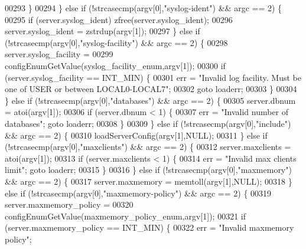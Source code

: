 \begin{DoxyCode}
{{00293             \}
00294         \} \textcolor{keywordflow}{else} \textcolor{keywordflow}{if} (!strcasecmp(argv[0],\textcolor{stringliteral}{"syslog-ident"}) && argc == 2) \{
00295             \textcolor{keywordflow}{if} (server.syslog\_ident) zfree(server.syslog\_ident);
00296             server.syslog\_ident = zstrdup(argv[1]);
00297         \} \textcolor{keywordflow}{else} \textcolor{keywordflow}{if} (!strcasecmp(argv[0],\textcolor{stringliteral}{"syslog-facility"}) && argc == 2) \{
00298             server.syslog\_facility =
00299                 configEnumGetValue(syslog\_facility\_enum,argv[1]);
00300             \textcolor{keywordflow}{if} (server.syslog\_facility == INT\_MIN) \{
00301                 err = \textcolor{stringliteral}{"Invalid log facility. Must be one of USER or between LOCAL0-LOCAL7"};
00302                 \textcolor{keywordflow}{goto} loaderr;
00303             \}
00304         \} \textcolor{keywordflow}{else} \textcolor{keywordflow}{if} (!strcasecmp(argv[0],\textcolor{stringliteral}{"databases"}) && argc == 2) \{
00305             server.dbnum = atoi(argv[1]);
00306             \textcolor{keywordflow}{if} (server.dbnum < 1) \{
00307                 err = \textcolor{stringliteral}{"Invalid number of databases"}; \textcolor{keywordflow}{goto} loaderr;
00308             \}
00309         \} \textcolor{keywordflow}{else} \textcolor{keywordflow}{if} (!strcasecmp(argv[0],\textcolor{stringliteral}{"include"}) && argc == 2) \{
00310             loadServerConfig(argv[1],NULL);
00311         \} \textcolor{keywordflow}{else} \textcolor{keywordflow}{if} (!strcasecmp(argv[0],\textcolor{stringliteral}{"maxclients"}) && argc == 2) \{
00312             server.maxclients = atoi(argv[1]);
00313             \textcolor{keywordflow}{if} (server.maxclients < 1) \{
00314                 err = \textcolor{stringliteral}{"Invalid max clients limit"}; \textcolor{keywordflow}{goto} loaderr;
00315             \}
00316         \} \textcolor{keywordflow}{else} \textcolor{keywordflow}{if} (!strcasecmp(argv[0],\textcolor{stringliteral}{"maxmemory"}) && argc == 2) \{
00317             server.maxmemory = memtoll(argv[1],NULL);
00318         \} \textcolor{keywordflow}{else} \textcolor{keywordflow}{if} (!strcasecmp(argv[0],\textcolor{stringliteral}{"maxmemory-policy"}) && argc == 2) \{
00319             server.maxmemory\_policy =
00320                 configEnumGetValue(maxmemory\_policy\_enum,argv[1]);
00321             \textcolor{keywordflow}{if} (server.maxmemory\_policy == INT\_MIN) \{
00322                 err = \textcolor{stringliteral}{"Invalid maxmemory policy"};
}}
\end{DoxyCode}
